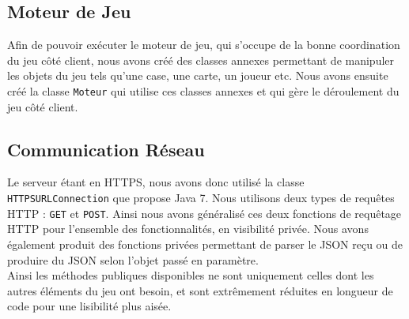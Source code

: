 	\subsection{Moteur de Jeu}
		Afin de pouvoir exécuter le moteur de jeu, qui s'occupe de la bonne coordination du jeu côté client, nous avons créé des classes annexes permettant de manipuler les objets du jeu tels qu'une case, une carte, un joueur etc. Nous avons ensuite créé la classe \texttt{Moteur} qui utilise ces classes annexes et qui gère le déroulement du jeu côté client.

	\subsection{Communication Réseau}
		Le serveur étant en HTTPS, nous avons donc utilisé la classe \texttt{HTTPSURLConnection} que propose Java 7. Nous utilisons deux types de requêtes HTTP : \texttt{GET} et \texttt{POST}. Ainsi nous avons généralisé ces deux fonctions de requêtage HTTP pour l'ensemble des fonctionnalités, en visibilité privée. Nous avons également produit des fonctions privées permettant de parser le JSON reçu ou de produire du JSON selon l'objet passé en paramètre.\\

		Ainsi les méthodes publiques disponibles ne sont uniquement celles dont les autres éléments du jeu ont besoin, et sont extrêmement réduites en longueur de code pour une lisibilité plus aisée.

